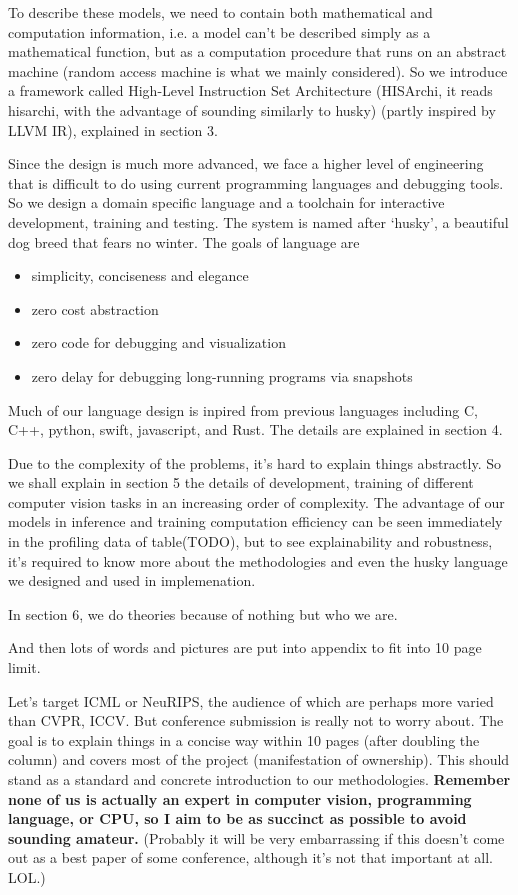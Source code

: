 \documentclass[10pt, oneside]{article}   	%
\theoremstyle{definition}
\begin{document}
To describe these models, we need to contain both mathematical and computation information, i.e. a model can't be described simply as a mathematical function, but as a computation procedure that runs on an abstract machine (random access machine is what we mainly considered). So we introduce a framework called High-Level Instruction Set Architecture (HISArchi, it reads hisarchi, with the advantage of sounding similarly to husky) (partly inspired by LLVM IR), explained in section 3.

Since the design is much more advanced, we face a higher level of engineering that is difficult to do using current programming languages and debugging tools. So we design a domain specific language and a toolchain for interactive development, training and testing. The system is named after `husky', a beautiful dog breed that fears no winter. The goals of language are
\begin{itemize}
	\item simplicity, conciseness and elegance
	\item zero cost abstraction
	\item zero code for debugging and visualization
	\item zero delay for debugging long-running programs via snapshots
\end{itemize}
Much of our language design is inpired from previous languages including C, C++, python, swift, javascript, and Rust. The details are explained in section 4.

Due to the complexity of the problems, it's hard to explain things abstractly. So we shall explain in section 5 the details of development, training of different computer vision tasks in an increasing order of complexity. The advantage of our models in inference and training computation efficiency can be seen immediately in the profiling data of table(TODO), but to see explainability and robustness, it's required to know more about the methodologies and even the husky language we designed and used in implemenation.

In section 6, we do theories because of nothing but who we are.

And then lots of words and pictures are put into appendix to fit into 10 page limit.

Let's target ICML or NeuRIPS, the audience of which are perhaps more varied than CVPR, ICCV. But conference submission is really not to worry about. The goal is to explain things in a concise way within 10 pages (after doubling the column) and covers most of the project (manifestation of ownership). This should stand as a standard and concrete introduction to our methodologies. \textbf{Remember none of us is actually an expert in computer vision, programming language, or CPU, so I aim to be as succinct as possible to avoid sounding amateur.} (Probably it will be very embarrassing if this doesn't come out as a best paper of some conference, although it's not that important at all. LOL.)
\end{document}
